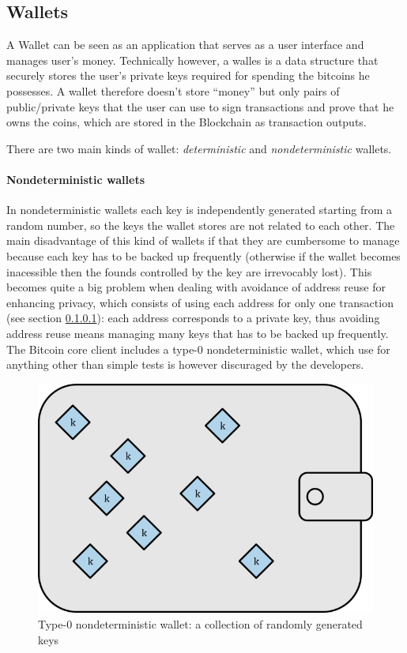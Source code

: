 \subsection{Wallets} A Wallet can be seen as an application that serves as a
user interface and manages user's money. Technically however, a walles is a data
structure that securely stores the user's private keys required for spending the
bitcoins he possesses. A wallet therefore doesn't store ``money'' but only pairs
of public/private keys that the user can use to sign transactions and prove that
he owns the coins, which are stored in the Blockchain as transaction outputs.

There are two main kinds of wallet: \emph{deterministic} and
\emph{nondeterministic} wallets.

\paragraph{Nondeterministic wallets} In nondeterministic wallets each key is
independently generated starting from a random number, so the keys the wallet
stores are not related to each other. The main disadvantage of this kind of
wallets if that they are cumbersome to manage because each key has to be backed
up frequently (otherwise if the wallet becomes inacessible then the founds
controlled by the key are irrevocably lost). This becomes quite a big problem
when dealing with avoidance of address reuse for enhancing privacy, which
consists of using each address for only one transaction (see section \ref{}):
each address corresponds to a private key, thus avoiding address reuse means
managing many keys that has to be backed up frequently. The Bitcoin core client
includes a type-0 nondeterministic wallet, which use for anything other than
simple tests is however discuraged by the developers.
\begin{figure}[!htb]
	\centering
	\includegraphics[width=0.5\linewidth]{img/nondeterministic-wallet.png}
	\caption{Type-0 nondeterministic wallet: a collection of randomly generated keys}
	\label{fig:nondeterministic-wallet}
\end{figure}

